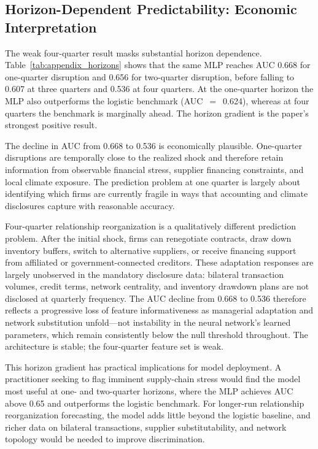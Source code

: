 \documentclass[12pt]{article}
\begin{document}
\subsection{Horizon-Dependent Predictability: Economic Interpretation}\label{subsec:horizon}

The weak four-quarter result masks substantial horizon dependence.
Table~\ref{tab:appendix_horizons} shows that the same MLP reaches AUC 0.668
for one-quarter disruption and 0.656 for two-quarter disruption, before
falling to 0.607 at three quarters and 0.536 at four quarters.  At the
one-quarter horizon the MLP also outperforms the logistic benchmark
(AUC~$=$~0.624), whereas at four quarters the benchmark is marginally ahead.
The horizon gradient is the paper's strongest positive result.

The decline in AUC from 0.668 to 0.536 is economically plausible.
One-quarter disruptions are temporally close to the realized shock and
therefore retain information from observable financial stress, supplier
financing constraints, and local climate exposure.  The prediction problem
at one quarter is largely about identifying which firms are currently fragile
in ways that accounting and climate disclosures capture with reasonable
accuracy.

Four-quarter relationship reorganization is a qualitatively different
prediction problem.  After the initial shock, firms can renegotiate contracts,
draw down inventory buffers, switch to alternative suppliers, or receive
financing support from affiliated or government-connected creditors.  These
adaptation responses are largely unobserved in the mandatory disclosure data:
bilateral transaction volumes, credit terms, network centrality, and inventory
drawdown plans are not disclosed at quarterly frequency.  The AUC decline from
0.668 to 0.536 therefore reflects a progressive loss of feature informativeness
as managerial adaptation and network substitution unfold---not instability in
the neural network's learned parameters, which remain consistently below the
null threshold throughout.  The architecture is stable; the four-quarter feature
set is weak.

This horizon gradient has practical implications for model deployment.  A
practitioner seeking to flag imminent supply-chain stress would find the model
most useful at one- and two-quarter horizons, where the MLP achieves AUC above
0.65 and outperforms the logistic benchmark.  For longer-run relationship
reorganization forecasting, the model adds little beyond the logistic baseline,
and richer data on bilateral transactions, supplier substitutability, and
network topology would be needed to improve discrimination.
\end{document}
